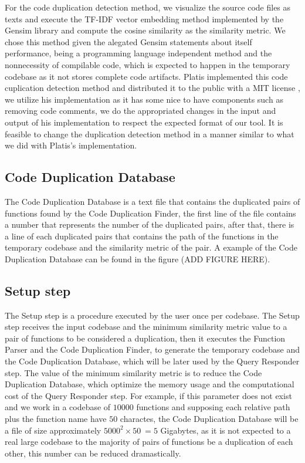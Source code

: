 For the code duplication detection method, we visualize the source code files as texts and execute the TF-IDF vector embedding method
implemented by the Gensim library \citep{gensim} and compute the cosine similarity as the similarity metric. We chose this method 
given the alegated Gensim statements about itself performance, being a programming language independent method and the nonnecessity of 
compilable code, which is expected to happen in the temporary codebase as it not stores complete code artifacts. Platis implemented
this code cuplication detection method and distributed it to the public with a MIT license \citep{platistool} \citep{mitlicense}, 
we utilize his implementation as it has some nice to have components such as removing code comments, we do the appropriated changes
in the input and output of his implementation to respect the expected format of our tool. 
It is feasible to change the duplication detection method in a manner similar to what we did with Platis's implementation.

\subsection{Code Duplication Database}

The Code Duplication Database is a text file that contains the duplicated pairs of functions found by the Code Duplication Finder, 
the first line of the file contains a number that represents the number of the duplicated pairs, after that, there is 
a line of each duplicated pairs that contains the path of the functions in the temporary codebase and the similarity metric of the 
pair. A example of the Code Duplication Database can be found in the figure (ADD FIGURE HERE). 

\subsection{Setup step}

\label{subsec:setup}

The Setup step is a procedure executed by the user once per codebase. The Setup step receives the input codebase and the minimum
similarity metric value to a pair of functions to be considered a duplication, then it executes the Function Parser and the Code 
Duplication Finder, to generate the temporary codebase and the Code Duplication Database, which will be later used by the Query
Responder step. The value of the minimum similarity metric is to reduce the Code Duplication Database, which optimize the
memory usage and the computational cost of the Query Responder step. For example, if this parameter does not exist and we work in 
a codebase of $10000$ functions and supposing each relative path plus the function name have $50$ charactes, the Code Duplication 
Database will be a file of size approximately $5000^2 \times 50 ~= 5$ Gigabytes, as it is not expected to a real large codebase 
to the majority of pairs of functions be a duplication of each other, this number can be reduced dramastically.


